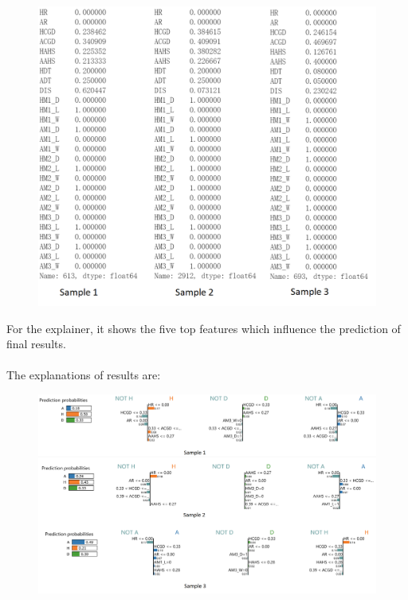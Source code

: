 \documentclass{article}
\begin{document}
\begin{figure}[ht]
\centering
\includegraphics[scale=0.4]{graphs/LIMEsample.png}
\caption{}
\label{fig:label}
\end{figure}

For the explainer, it shows the five top features which influence the prediction of final results.\\
~\\
The explanations of results are:

\begin{figure}[ht]
\centering
\includegraphics[scale=0.4]{graphs/LIMEresult.png}
\caption{}
\label{fig:label}
\end{figure}
\end{document}
